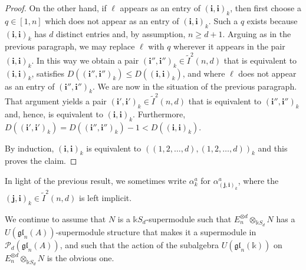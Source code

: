 \documentclass[11pt,reqno]{amsart} %
\newcommand{\gl}{\mathfrak{gl}}
\renewcommand{\k}{\mathds{k}}
\newcommand{\0}{\bar{0}}
\newcommand{\1}{\bar{1}}
\newcommand{\bi}{\mathbf{i}}
\newcommand{\bj}{\mathbf{j}}
\newcommand{\Itwo}{\tilde{I}^{2}(n,d)}
\newcommand{\Pol}{\mathcal{P}}
\numberwithin{equation}{subsection}
\begin{document}
\begin{proof}
On the other hand, if $\ell$ appears as an entry of $(\bi, \bi)_{k}$, then first choose a $q \in [1,n]$ which does not appear as an entry of $(\bi, \bi)_{k}$.  Such a $q$ exists because  $(\bi, \bi)_{k}$ has $d$ distinct entries and, by assumption, $n \geq  d+1$.  Arguing as in the previous paragraph, we may replace $\ell$ with $q$ wherever it appears in the pair $(\bi, \bi)_{k}$.  In this way we obtain a pair $(\bi'', \bi'')_{k} \in  \Itwo$ that is equivalent to $(\bi, \bi)_{k}$, satisfies $D((\bi'' , \bi'')_{k}) \leq D((\bi , \bi )_{k})$, and where $\ell$ does not appear as an entry of $(\bi'' , \bi'')_{k}$. We are now in the situation of the previous paragraph.  That argument yields a pair $(\bi ' , \bi ')_{k} \in \Itwo$ that is equivalent to $(\bi'', \bi'')_{k}$ and, hence, is equivalent to $(\bi , \bi)_{k}$.  Furthermore, $D((\bi', \bi')_{k}) = D((\bi'', \bi'')_{k})-1 < D((\bi, \bi)_{k})$.

By induction, $(\bi, \bi)_{k}$ is equivalent to $((1,2,\dotsc  ,d),(1,2,\dotsc,d))_{k}$ and this proves the claim.
\end{proof}

In light of the previous result, we sometimes write $\alpha^{a}_{k}$ for $\alpha^{a}_{(\bj , \bi)_{k}}$, where the $(\bj , \bi )_{k} \in \Itwo$ is left implicit.

We continue to assume that $N$ is a $\k S_{d}$-supermodule such that $E_{n}^{\otimes d} \otimes_{\k S_{d}} N$ has a $U(\gl_{n}(A))$-supermodule structure that makes it a supermodule in $\Pol_{d}(\gl_{n}(A))$, and such that the  action of the subalgebra $U(\gl_{n}(\k))$ on $E_{n}^{\otimes d} \otimes_{\k S_{d}} N$ is the obvious one.
\end{document}
